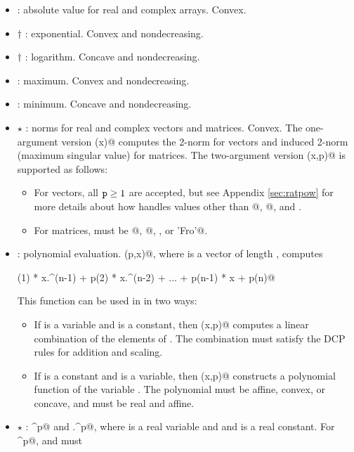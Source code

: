 \documentclass[12pt]{article}
\begin{document}
\begin{itemize}
\item \verb@abs@: absolute value for real 
and complex arrays.
Convex.
\item $\dagger$ \verb@exp@: exponential. Convex and nondecreasing.
\item $\dagger$ \verb@log@: logarithm. Concave and nondecreasing.
\item \verb@max@: maximum. Convex and nondecreasing.
\item \verb@min@: minimum. Concave and nondecreasing.
\item $\star$ \verb@norm@: norms for real and complex vectors and matrices. Convex. 
The one-argument version \verb@norm(x)@ computes the 2-norm for vectors and 
induced 2-norm (maximum singular value) for matrices. 
The two-argument version \verb@norm(x,p)@ is supported as follows:
\begin{itemize}
\item For vectors, all $\verb@p@\geq 1$ are accepted, but see
Appendix \ref{sec:ratpow} for more details about how \cvx
handles values other than @, @, and \verb@Inf@.
\item For matrices, \verb@p@ must be @, @, \verb@Inf@, or
\verb@'Fro'@.
\end{itemize}
\item \verb@polyval@: polynomial evaluation. \verb@polyval(p,x)@, 
where \verb@p@ is a vector of length \verb@n@, computes
\begin{center}
	\verb@p(1) * x.^(n-1) + p(2) * x.^(n-2) + ... + p(n-1) * x + p(n)@
\end{center}
This function can be used in \cvx in two ways:
\begin{itemize}
\item If \verb@p@ is a variable and \verb@x@ is a constant, then \verb@polyval(x,p)@
	  computes a linear combination of the elements of \verb@p@. The combination
	  must satisfy the DCP rules for addition and scaling.
\item If \verb@p@ is a constant and \verb@x@ is a variable, then \verb@polyval(x,p)@
      constructs a polynomial function of the variable \verb@x@. The 
      polynomial must be affine, convex, or concave, and 
       \verb@x@ must be real and affine.
\end{itemize}
\item $\star$ \verb@power@: \verb@x^p@ and \verb@x.^p@, where \verb@x@ is a real variable and
and \verb@p@ is a real constant. For \verb@x^p@, \verb@x@ and \verb@p@ must

\end{itemize}
\end{document}
